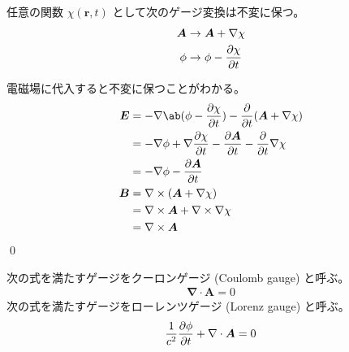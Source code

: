 \documentclass[uplatex,dvipdfmx,a4paper,11pt]{jlreq}
\makeatletter
\newcommand{\EE}{\bm{E}}
\newcommand{\BB}{\bm{B}}
\renewcommand{\AA}{\bm{A}}
\newcommand{\rr}{\bm{r}}
\newcommand{\vnabla}{\mathbf{\nabla}}
\numberwithin{equation}{section}
\theoremstyle{definition}
\renewenvironment{proof}[1][\proofname]{\par
  \normalfont
  \topsep6\p@\@plus6\p@ \trivlist
  \item[\hskip\labelsep{\bfseries #1}\@addpunct{\bfseries}]\ignorespaces\quad\par
}{%
  \qed\endtrivlist\@endpefalse
}
\renewcommand\proofname{証明}
\makeatother
\begin{document}
\begin{theorem}[ゲージ変換]
  任意の関数 $\chi(\rr, t)$ として次のゲージ変換は不変に保つ。
  \begin{align}
    \AA  & \to \AA + \vnabla\chi      \\
    \phi & \to \phi - \diffp{\chi}{t}
  \end{align}
\end{theorem}
\begin{proof}
  電磁場に代入すると不変に保つことがわかる。
  \begin{align}
    \EE & = - \vnabla\ab(\phi - \diffp{\chi}{t}) - \diffp{}{t}(\AA + \vnabla\chi)            \\
        & = - \vnabla\phi + \vnabla\diffp{\chi}{t} - \diffp{\AA}{t} - \diffp{}{t}\vnabla\chi \\
        & = - \vnabla\phi - \diffp{\AA}{t}                                                   \\
    \BB & = \vnabla\times(\AA + \vnabla\chi)                                                 \\
        & = \vnabla\times\AA + \vnabla\times\vnabla\chi                                      \\
        & = \vnabla\times\AA
  \end{align}
\end{proof}

\begin{definition}
  次の式を満たすゲージをクーロンゲージ (Coulomb gauge) と呼ぶ。
  \begin{align}
    \vnabla\cdot\AA = 0
  \end{align}
  次の式を満たすゲージをローレンツゲージ (Lorenz gauge) と呼ぶ。
  \begin{align}
    \frac{1}{c^2}\diffp{\phi}{t} + \vnabla\cdot\AA = 0
  \end{align}
\end{definition}
\end{document}
